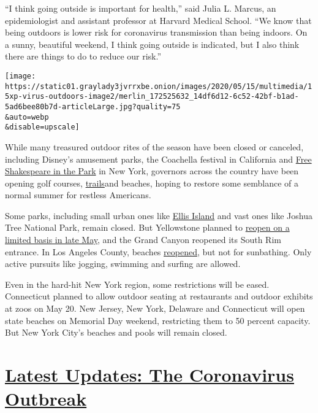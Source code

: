 ``I think going outside is important for health,'' said Julia L. Marcus,
an epidemiologist and assistant professor at Harvard Medical School.
``We know that being outdoors is lower risk for coronavirus transmission
than being indoors. On a sunny, beautiful weekend, I think going outside
is indicated, but I also think there are things to do to reduce our
risk.''

\texttt{[image: https://static01.graylady3jvrrxbe.onion/images/2020/05/15/multimedia/15xp-virus-outdoors-image2/merlin\_172525632\_14df6d12-6c52-42bf-b1ad-5ad6bee80b7d-articleLarge.jpg?quality=75\\\&auto=webp\\\&disable=upscale]}

While many treasured outdoor rites of the season have been closed or
canceled, including Disney's amusement parks, the Coachella festival in
California and
\href{https://publictheater.org/programs/shakespeare-in-the-park/}{Free
Shakespeare in the Park} in New York, governors across the country have
been opening golf courses,
\href{https://www.nytimes3xbfgragh.onion/2020/05/21/us/appalachian-trail-coronavirus.html}{trails}and
beaches, hoping to restore some semblance of a normal summer for
restless Americans.

Some parks, including small urban ones like
\href{https://www.nps.gov/elis/index.htm}{Ellis Island} and vast ones
like Joshua Tree National Park, remain closed. But Yellowstone planned
to \href{https://www.nps.gov/yell/learn/news/20015.htm}{reopen on a
limited basis in late May}, and the Grand Canyon reopened its South Rim
entrance. In Los Angeles County, beaches
\href{https://twitter.com/SupJaniceHahn/status/1259875923785965568?s=20}{reopened},
but not for sunbathing. Only active pursuits like jogging, swimming and
surfing are allowed.

Even in the hard-hit New York region, some restrictions will be eased.
Connecticut planned to allow outdoor seating at restaurants and outdoor
exhibits at zoos on May 20. New Jersey, New York, Delaware and
Connecticut will open state beaches on Memorial Day weekend, restricting
them to 50 percent capacity. But New York City's beaches and pools will
remain closed.

\hypertarget{latest-updates-the-coronavirus-outbreak}{%
\section{\texorpdfstring{\href{https://www.nytimes3xbfgragh.onion/2020/09/08/world/covid-19-coronavirus.html?action=click\&pgtype=Article\&state=default\&region=MAIN_CONTENT_1\&context=storylines_live_updates}{Latest
Updates: The Coronavirus
Outbreak}}{Latest Updates: The Coronavirus Outbreak}}\label{latest-updates-the-coronavirus-outbreak}}

